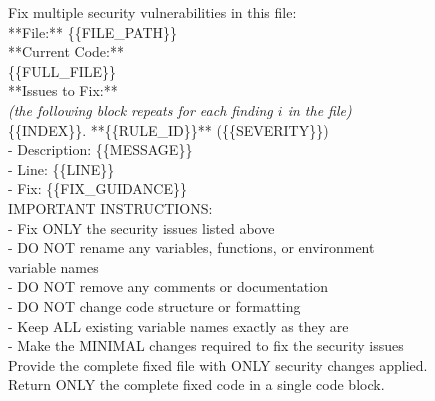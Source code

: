 \documentclass[preprint,12pt]{elsarticle}
\begin{document}
\begin{tcolorbox}[
    colback=gray!5!white,
    colframe=gray!75!black,
    title=User message template B --- batch (one call per file),
    fonttitle=\bfseries,
    breakable
]
\small\ttfamily
Fix multiple security vulnerabilities in this file:\\[6pt]
**File:** \{\{FILE\_PATH\}\}\\[6pt]
**Current Code:**\\
\{\{FULL\_FILE\}\}\\[6pt]
**Issues to Fix:**\\[6pt]
\textrm{\itshape(the following block repeats for each finding $i$ in the file)}\\
\{\{INDEX\}\}. **\{\{RULE\_ID\}\}** (\{\{SEVERITY\}\})\\
\hspace*{1em}- Description: \{\{MESSAGE\}\}\\
\hspace*{1em}- Line: \{\{LINE\}\}\\
\hspace*{1em}- Fix: \{\{FIX\_GUIDANCE\}\}\\[6pt]
IMPORTANT INSTRUCTIONS:\\
\hspace*{1em}- Fix ONLY the security issues listed above\\
\hspace*{1em}- DO NOT rename any variables, functions, or environment\\
\hspace*{2em}variable names\\
\hspace*{1em}- DO NOT remove any comments or documentation\\
\hspace*{1em}- DO NOT change code structure or formatting\\
\hspace*{1em}- Keep ALL existing variable names exactly as they are\\
\hspace*{1em}- Make the MINIMAL changes required to fix the security issues\\[6pt]
Provide the complete fixed file with ONLY security changes applied.\\
Return ONLY the complete fixed code in a single code block.
\end{tcolorbox}
\end{document}
